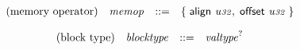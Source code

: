 \vspace{1ex}

$$
\begin{array}{@{}lrrl@{}l@{}}
\mbox{(memory operator)} & {\mathit{memop}} &::=& \{\; \begin{array}[t]{@{}l@{}l@{}}
\mathsf{align}~{\mathit{u{\scriptstyle32}}},\; \mathsf{offset}~{\mathit{u{\scriptstyle32}}} \;\}\end{array} \\
\end{array}
$$

\vspace{1ex}

$$
\begin{array}{@{}lrrl@{}l@{}}
\mbox{(block type)} & {\mathit{blocktype}} &::=& {{\mathit{valtype}}^?} \\
\end{array}
$$

